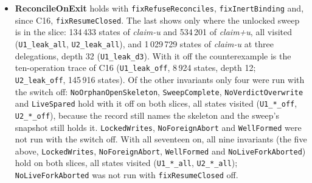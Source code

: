 \documentclass[a4paper,10pt,fleqn]{article}
\newcommand{\field}[1]{\texttt{#1}}
\begin{document}
\begin{itemize}
    amendments are necessary where a run isolates them: \texttt{Fb2\_w}
    (\field{fixDeleteCloses}); \texttt{Fa\_orph\_norel} (C11) and
    \texttt{C9\_nosup} (C9) with the record not durable (and
    \field{fixClaimLive} off, which adopts a skeleton whose record it then
    removes: \texttt{C17\_nodur}). \textbf{With the record
    durable they are no longer needed for this invariant}:
    \texttt{Fa\_orph\_norel\_dur} and \texttt{C9\_nosup\_dur} hold, since the
    record names the skeleton and the release and the clearing close what it
    names. The design may take either set; the durable record subsumes them.
    With \field{fixRefuseReconciles} and \field{fixInertBinding} the exit
    postcondition \field{ReconcileOnExit} holds as well (68\,961 states with the
    two switches, 19\,481 with all seventeen, all visited, and 271\,253 in
    \emph{claim+}), the ghost being computed with the notion of live that a
    complete record needs. \field{SweepComplete} holds with \field{fixDeleteCloses} and
    \field{fixPostCheck} (37\,025 states of the \emph{sweep} slice, all
    visited), stated of the skeletons the sweep has not yet written.
  \item \textbf{ReconcileOnExit} holds with \field{fixRefuseReconciles},
    \field{fixInertBinding} and, since C16, \field{fixResumeClosed}. The last
    shows only where the unlocked sweep is in the slice: 134\,433 states of
    \emph{claim-u} and 534\,201 of \emph{claim+u}, all visited
    (\texttt{U1\_leak\_all}, \texttt{U2\_leak\_all}), and 1\,029\,729 states of
    \emph{claim-u} at three delegations, depth 32 (\texttt{U1\_leak\_d3}). With
    it off the counterexample is the ten-operation trace of C16
    (\texttt{U1\_leak\_off}, 8\,924 states, depth 12; \texttt{U2\_leak\_off},
    145\,916 states). Of the other invariants only four were run with the switch
    off: \field{NoOrphanOpenSkeleton}, \field{SweepComplete},
    \field{NoVerdictOverwrite} and \field{LiveSpared} hold with it off on both
    slices, all states visited (\texttt{U1\_*\_off}, \texttt{U2\_*\_off}),
    because the record still names the skeleton and the sweep's snapshot still
    holds it. \field{LockedWrites}, \field{NoForeignAbort} and
    \field{WellFormed} were not run with the switch off. With all seventeen on, all nine invariants (the five above,
    \field{LockedWrites}, \field{NoForeignAbort}, \field{WellFormed} and
    \field{NoLiveForkAborted}) hold on both slices, all states visited
    (\texttt{U1\_*\_all}, \texttt{U2\_*\_all}); \field{NoLiveForkAborted} was not
    run with \field{fixResumeClosed} off.

\end{itemize}
\end{document}
